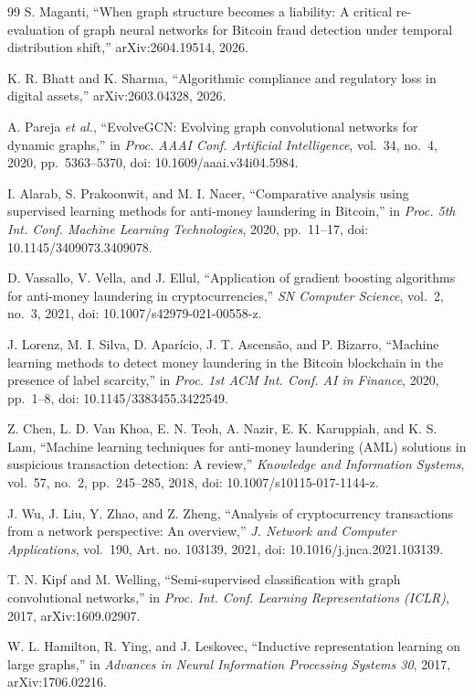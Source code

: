 \documentclass[conference]{IEEEtran}
\begin{document}
\begin{thebibliography}{99}
 S. Maganti, ``When graph structure becomes a liability: A critical re-evaluation of graph neural networks for Bitcoin fraud detection under temporal distribution shift,'' arXiv:2604.19514, 2026.

 K. R. Bhatt and K. Sharma, ``Algorithmic compliance and regulatory loss in digital assets,'' arXiv:2603.04328, 2026.

 A. Pareja \emph{et al.}, ``EvolveGCN: Evolving graph convolutional networks for dynamic graphs,'' in \emph{Proc. AAAI Conf. Artificial Intelligence}, vol.~34, no.~4, 2020, pp.~5363--5370, doi: 10.1609/aaai.v34i04.5984.

 I. Alarab, S. Prakoonwit, and M. I. Nacer, ``Comparative analysis using supervised learning methods for anti-money laundering in Bitcoin,'' in \emph{Proc. 5th Int. Conf. Machine Learning Technologies}, 2020, pp.~11--17, doi: 10.1145/3409073.3409078.

 D. Vassallo, V. Vella, and J. Ellul, ``Application of gradient boosting algorithms for anti-money laundering in cryptocurrencies,'' \emph{SN Computer Science}, vol.~2, no.~3, 2021, doi: 10.1007/s42979-021-00558-z.

 J. Lorenz, M. I. Silva, D. Apar\'icio, J. T. Ascens\~ao, and P. Bizarro, ``Machine learning methods to detect money laundering in the Bitcoin blockchain in the presence of label scarcity,'' in \emph{Proc. 1st ACM Int. Conf. AI in Finance}, 2020, pp.~1--8, doi: 10.1145/3383455.3422549.

 Z. Chen, L. D. Van Khoa, E. N. Teoh, A. Nazir, E. K. Karuppiah, and K. S. Lam, ``Machine learning techniques for anti-money laundering (AML) solutions in suspicious transaction detection: A review,'' \emph{Knowledge and Information Systems}, vol.~57, no.~2, pp.~245--285, 2018, doi: 10.1007/s10115-017-1144-z.

 J. Wu, J. Liu, Y. Zhao, and Z. Zheng, ``Analysis of cryptocurrency transactions from a network perspective: An overview,'' \emph{J. Network and Computer Applications}, vol.~190, Art. no. 103139, 2021, doi: 10.1016/j.jnca.2021.103139.

 T. N. Kipf and M. Welling, ``Semi-supervised classification with graph convolutional networks,'' in \emph{Proc. Int. Conf. Learning Representations (ICLR)}, 2017, arXiv:1609.02907.

 W. L. Hamilton, R. Ying, and J. Leskovec, ``Inductive representation learning on large graphs,'' in \emph{Advances in Neural Information Processing Systems 30}, 2017, arXiv:1706.02216.


\end{thebibliography}
\end{document}
